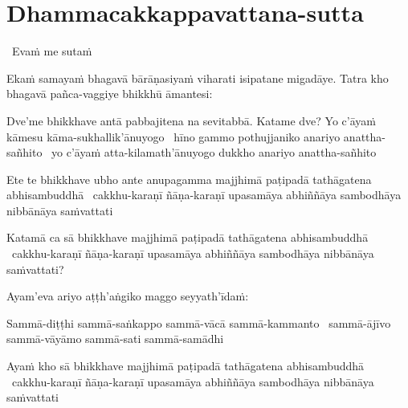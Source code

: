 
\section{Dhammacakkappavattana-sutta}
\label{dhammacakkappavattana-full}

\begin{leader}
  \anglebracketleft\ \hspace{-0.5mm}Evaṁ me sutaṁ \hspace{-0.5mm}\anglebracketright\
\end{leader}

\begin{pali-hang}
  Ekaṁ samayaṁ bhagavā bārāṇasiyaṁ viharati isipatane migadāye. Tatra kho bhagavā pañca-vaggiye bhikkhū āmantesi:
\end{pali-hang}

\begin{pali-hang}
  Dve'me bhikkhave antā pabbajitena na sevitabbā. Katame dve? Yo c'āyaṁ kāmesu kāma-sukhallik'ānuyogo \breathmark\ hīno gammo pothujjaniko anariyo anattha-sañhito \breathmark\ yo c'āyaṁ atta-kilamath'ānuyogo dukkho anariyo anattha-sañhito
\end{pali-hang}

\begin{pali-hang}
  Ete te bhikkhave ubho ante anupagamma majjhimā paṭipadā tathāgatena abhisambuddhā \breathmark\ cakkhu-karaṇī ñāṇa-karaṇī upasamāya abhiññāya sambodhāya nibbānāya saṁvattati
\end{pali-hang}

\begin{pali-hang}
  Katamā ca sā bhikkhave majjhimā paṭipadā tathāgatena abhisambuddhā \breathmark\ cakkhu-karaṇī ñāṇa-karaṇī upasamāya abhiññāya sambodhāya nibbānāya saṁvattati?
\end{pali-hang}

\ifninebythirteen\clearpage\fi

\begin{pali-hang}
  Ayam'eva ariyo aṭṭh'aṅgiko maggo seyyath'īdaṁ:
\end{pali-hang}

\begin{pali-hang}
  Sammā-diṭṭhi sammā-saṅkappo sammā-vācā sammā-kammanto \breathmark\ sammā-ājīvo sammā-vāyāmo sammā-sati sammā-samādhi
\end{pali-hang}

\begin{pali-hang}
  Ayaṁ kho sā bhikkhave majjhimā paṭipadā tathāgatena abhisambuddhā \breathmark\ cakkhu-karaṇī ñāṇa-karaṇī upasamāya abhiññāya sambodhāya nibbānāya saṁvattati
\end{pali-hang}


